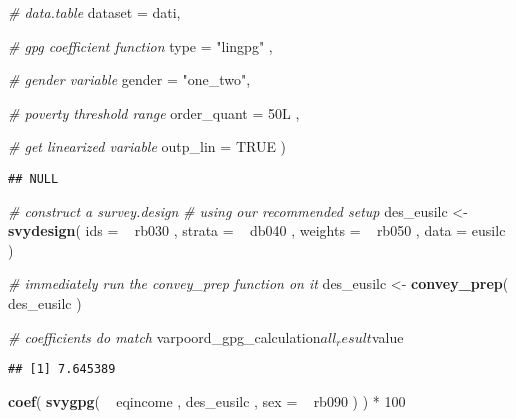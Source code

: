\documentclass[]{book}
\newenvironment{Shaded}{\begin{snugshade}}{\end{snugshade}}
\newcommand{\KeywordTok}[1]{\textcolor[rgb]{0.13,0.29,0.53}{\textbf{{#1}}}}
\newcommand{\DataTypeTok}[1]{\textcolor[rgb]{0.13,0.29,0.53}{{#1}}}
\newcommand{\DecValTok}[1]{\textcolor[rgb]{0.00,0.00,0.81}{{#1}}}
\newcommand{\StringTok}[1]{\textcolor[rgb]{0.31,0.60,0.02}{{#1}}}
\newcommand{\CommentTok}[1]{\textcolor[rgb]{0.56,0.35,0.01}{\textit{{#1}}}}
\newcommand{\OtherTok}[1]{\textcolor[rgb]{0.56,0.35,0.01}{{#1}}}
\newcommand{\NormalTok}[1]{{#1}}
\begin{document}
\begin{Shaded}
\begin{Highlighting}[]
        \CommentTok{# data.table}
        \DataTypeTok{dataset =} \NormalTok{dati, }
        
        \CommentTok{# gpg coefficient function}
        \DataTypeTok{type =} \StringTok{"lingpg"} \NormalTok{,}
        
        \CommentTok{# gender variable}
        \DataTypeTok{gender =} \StringTok{"one_two"}\NormalTok{,}
      
      \CommentTok{# poverty threshold range}
      \DataTypeTok{order_quant =} \NormalTok{50L ,}
      
      \CommentTok{# get linearized variable}
      \DataTypeTok{outp_lin =} \OtherTok{TRUE}
    \NormalTok{)}
\end{Highlighting}
\end{Shaded}

\begin{verbatim}
## NULL
\end{verbatim}

\begin{Shaded}
\begin{Highlighting}[]
\CommentTok{# construct a survey.design}
\CommentTok{# using our recommended setup}
\NormalTok{des_eusilc <-}\StringTok{ }
\StringTok{    }\KeywordTok{svydesign}\NormalTok{( }
        \DataTypeTok{ids =} \NormalTok{~}\StringTok{ }\NormalTok{rb030 , }
        \DataTypeTok{strata =} \NormalTok{~}\StringTok{ }\NormalTok{db040 ,  }
        \DataTypeTok{weights =} \NormalTok{~}\StringTok{ }\NormalTok{rb050 , }
        \DataTypeTok{data =} \NormalTok{eusilc}
    \NormalTok{)}

\CommentTok{# immediately run the convey_prep function on it}
\NormalTok{des_eusilc <-}\StringTok{ }\KeywordTok{convey_prep}\NormalTok{( des_eusilc )}

\CommentTok{# coefficients do match}
\NormalTok{varpoord_gpg_calculation$all_result$value}
\end{Highlighting}
\end{Shaded}

\begin{verbatim}
## [1] 7.645389
\end{verbatim}

\begin{Shaded}
\begin{Highlighting}[]
\KeywordTok{coef}\NormalTok{( }\KeywordTok{svygpg}\NormalTok{( ~}\StringTok{ }\NormalTok{eqincome , des_eusilc , }\DataTypeTok{sex =} \NormalTok{~}\StringTok{ }\NormalTok{rb090 ) ) *}\StringTok{ }\DecValTok{100}
\end{Highlighting}
\end{Shaded}
\end{document}
